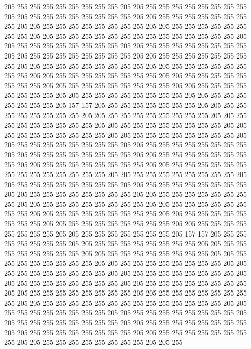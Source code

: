 205 255 255 255 255 255 255 255 255 205 205 255 255 255 255 255 255 255 255 205
205 255 255 255 255 255 255 255 255 205 205 255 255 255 255 255 255 255 255 205
205 255 255 255 255 255 255 255 255 205 205 255 255 255 255 255 255 255 255 205
205 255 255 255 255 255 255 255 255 255 255 255 255 255 255 205 205 255 255 255
255 255 255 255 255 205 205 255 255 255 255 255 255 255 255 205 205 255 255 255
255 255 255 255 255 205 205 255 255 255 255 255 255 255 255 205 205 255 255 255
255 255 255 255 255 205 205 255 255 255 255 255 255 255 255 205 205 255 255 255
255 255 255 255 255 205 205 255 255 255 255 255 255 255 255 205 205 255 255 255
255 255 255 255 255 205 205 255 255 255 255 255 255 255 255 205 205 255 255 255
255 255 255 255 255 205 205 255 255 255 255 255 255 255 205 157 157 205 255 255
255 255 255 255 255 205 205 255 255 255 255 255 255 255 255 205 205 255 255 255
255 255 255 255 255 205 205 255 255 255 255 255 255 255 255 205 205 255 255 255
255 255 255 255 255 205 205 255 255 255 255 255 255 255 255 205 205 255 255 255
255 255 255 255 255 205 205 255 255 255 255 255 255 255 255 205 205 255 255 255
255 255 255 255 255 205 205 255 255 255 255 255 255 255 255 205 205 255 255 255
255 255 255 255 255 205 205 255 255 255 255 255 255 255 255 205 205 255 255 255
255 255 255 255 255 255 255 255 255 255 255 205 205 255 255 255 255 255 255 255
255 205 205 255 255 255 255 255 255 255 255 205 205 255 255 255 255 255 255 255
255 205 205 255 255 255 255 255 255 255 255 205 205 255 255 255 255 255 255 255
255 205 205 255 255 255 255 255 255 255 255 205 205 255 255 255 255 255 255 255
255 205 205 255 255 255 255 255 255 255 255 205 205 255 255 255 255 255 255 255
255 205 205 255 255 255 255 255 255 255 255 205 205 255 255 255 255 255 255 255
255 205 205 255 255 255 255 255 255 255 205 157 157 205 255 255 255 255 255 255
255 205 205 255 255 255 255 255 255 255 255 205 205 255 255 255 255 255 255 255
255 205 205 255 255 255 255 255 255 255 255 205 205 255 255 255 255 255 255 255
255 205 205 255 255 255 255 255 255 255 255 205 205 255 255 255 255 255 255 255
255 205 205 255 255 255 255 255 255 255 255 205 205 255 255 255 255 255 255 255
255 205 205 255 255 255 255 255 255 255 255 205 205 255 255 255 255 255 255 255
255 205 205 255 255 255 255 255 255 255 255 205 205 255 255 255 255 255 255 255
255 255 255 255 255 255 255 205 205 255 255 255 255 255 255 255 255 205 205 255
255 255 255 255 255 255 255 205 205 255 255 255 255 255 255 255 255 205 205 255
255 255 255 255 255 255 255 205 205 255 255 255 255 255 255 255 255 205 205 255
255 255 255 255 255 255 255 205 205 255 255 255 255 255 255 255 255 205 205 255
